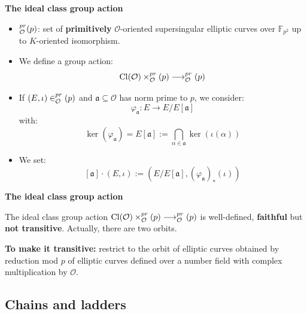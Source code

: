 \documentclass[10pt]{beamer}
\theoremstyle{plain}
\theoremstyle{definition}
\newcommand{\F}{\mathbb{F}}
\newcommand{\mO}{\mathcal{O}}
\renewcommand{\(}{\left(}
\renewcommand{\)}{\right)}
\newcommand{\mf}[1]{\mathfrak{#1}}
\DeclareMathOperator{\Cl}{Cl}
\let\SS\relax
\DeclareMathOperator{\SS}{SS}
\begin{document}
\begin{frame}
\textbf{The ideal class group action}

\vspace{0.5cm}

\begin{itemize}
\item $\SS_{\mO}^{pr}(p)$: set of \textbf{primitively} $\mO$-oriented supersingular elliptic curves over $\F_{p^2}$ up to $K$-oriented isomorphism.
\item We define a group action:
\[\Cl(\mO)\times\SS_{\mO}^{pr}(p)\longrightarrow \SS_{\mO}^{pr}(p)\]
\item If $(E,\iota)\in \SS_{\mO}^{pr}(p)$ and $\mf{a}\subseteq\mO$ has norm prime to $p$, we consider:
\[\varphi_{\mf{a}}:E\longrightarrow E/E[\mf{a}]\]
with:
\[\ker(\varphi_{\mf{a}})=E[\mf{a}]:=\bigcap_{\alpha\in\mf{a}}\ker(\iota(\alpha))\]
\item We set:
\[[\mf{a}]\cdot (E,\iota):=(E/E[\mf{a}],(\varphi_{\mf{a}})_*(\iota))\]
\end{itemize}
\end{frame}

\begin{frame}
\textbf{The ideal class group action}

\vspace{0.5cm}

\begin{theorem}[Onuki]
The ideal class group action $\Cl(\mO)\times\SS_{\mO}^{pr}(p)\longrightarrow \SS_{\mO}^{pr}(p)$ is well-defined, \textbf{faithful} but \textbf{not transitive}. Actually, there are two orbits.
\end{theorem}

\vspace{0.5cm}

\pause

\textbf{To make it transitive:} restrict to the orbit of elliptic curves obtained by reduction mod $p$ of elliptic curves defined over a number field with complex multiplication by $\mO$. 

\end{frame}

\subsection{Chains and ladders}
\end{document}
